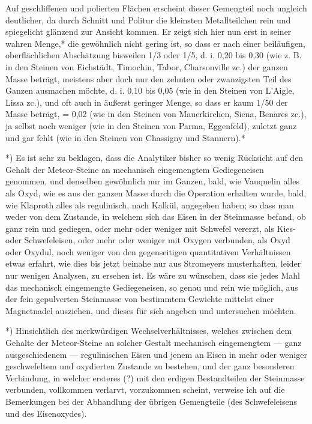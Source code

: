 \documentclass[a4paper, 11pt, oneside, german]{article}
\begin{document}
Auf geschliffenen und polierten Flächen erscheint dieser Gemengteil noch ungleich deutlicher, da durch Schnitt und Politur die kleinsten Metallteilchen rein und spiegelicht glänzend zur Ansicht kommen. Er zeigt sich hier nun erst in seiner wahren Menge,* die gewöhnlich nicht gering ist, so dass er nach einer beiläufigen, oberflächlichen Abschätzung bisweilen 1/3 oder 1/5, d. i. 0,20 bis 0,30 (wie z. B. in den Steinen von Eichstädt, Timochin, Tabor, Charsonville zc.) der ganzen Masse beträgt, meistens aber doch nur den zehnten oder zwanzigsten Teil des Ganzen ausmachen möchte, d. i. 0,10 bis 0,05 (wie in den Steinen von L'Aigle, Lissa zc.), und oft auch in äußerst geringer Menge, so dass er kaum 1/50 der Masse beträgt, = 0,02 (wie in den Steinen von Mauerkirchen, Siena, Benares zc.), ja selbst noch weniger (wie in den Steinen von Parma, Eggenfeld), zuletzt ganz und gar fehlt (wie in den Steinen von Chassigny und Stannern).*

*) Es ist sehr zu beklagen, dass die Analytiker bisher so wenig Rücksicht auf den Gehalt der Meteor-Steine an mechanisch eingemengtem Gediegeneisen genommen, und denselben gewöhnlich nur im Ganzen, bald, wie Vauquelin alles als Oxyd, wie es aus der ganzen Masse durch die Operation erhalten wurde, bald, wie Klaproth alles als regulinisch, nach Kalkül, angegeben haben; so dass man weder von dem Zustande, in welchem sich das Eisen in der Steinmasse befand, ob ganz rein und gediegen, oder mehr oder weniger mit Schwefel vererzt, als Kies- oder Schwefeleisen, oder mehr oder weniger mit Oxygen verbunden, als Oxyd oder Oxydul, noch weniger von den gegenseitigen quantitativen Verhältnissen etwas erfahrt, wie dies bis jetzt beinahe nur aus Stromeyers musterhaften, leider nur wenigen Analysen, zu ersehen ist. Es wäre zu wünschen, dass sie jedes Mahl das mechanisch eingemengte Gediegeneisen, so genau und rein wie möglich, aus der fein gepulverten Steinmasse von bestimmtem Gewichte mittelst einer Magnetnadel ausziehen, und dieses für sich angeben und untersuchen möchten.

*) Hinsichtlich des merkwürdigen Wechselverhältnisses, welches zwischen dem Gehalte der Meteor-Steine an solcher Gestalt mechanisch eingemengtem --- ganz ausgeschiedenem --- regulinischen Eisen und jenem an Eisen in mehr oder weniger geschwefeltem und oxydierten Zustande zu bestehen, und der ganz besonderen Verbindung, in welcher ersteres (?) mit den erdigen Bestandteilen der Steinmasse verbunden, vollkommen verlarvt, vorzukommen scheint, verweise ich auf die Bemerkungen bei der Abhandlung der übrigen Gemengteile (des Schwefeleisens und des Eisenoxydes).
\end{document}
